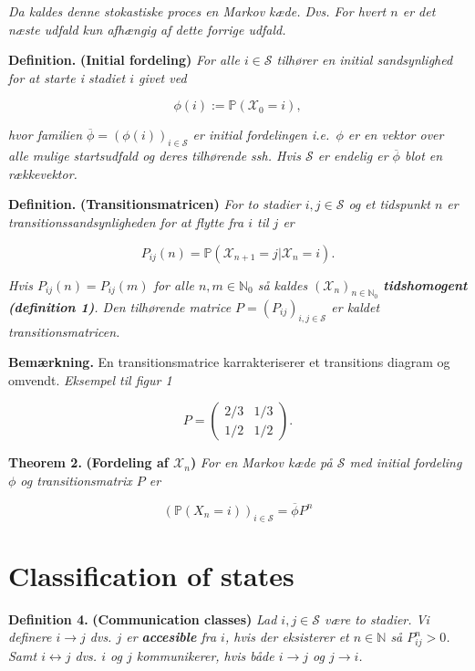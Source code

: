 \documentclass[a4paper,12pt,openany]{book}
\begin{document}
\emph{Da kaldes denne stokastiske proces en Markov kæde. Dvs. For hvert \(n\) er det næste udfald kun afhængig af dette forrige udfald.}

\textbf{Definition.} \textbf{(Initial fordeling)} \emph{For alle \(i\in\mathcal{S}\) tilhører en initial sandsynlighed for at starte i stadiet \(i\) givet ved}

\[
\phi(i):=\mathbb{P}(\mathcal{X}_0=i),
\]

\emph{hvor familien \(\overline{\phi}=(\phi(i))_{i\in\mathcal{S}}\) er initial fordelingen i.e.~\(\phi\) er en vektor over alle mulige startsudfald og deres tilhørende ssh. Hvis \(\mathcal{S}\) er endelig er \(\overline{\phi}\) blot en rækkevektor.}

\textbf{Definition.} \textbf{(Transitionsmatricen)} \emph{For to stadier \(i,j\in\mathcal{S}\) og et tidspunkt \(n\) er transitionssandsynligheden for at flytte fra \(i\) til \(j\) er}

\[
P_{ij}(n)=\mathbb{P}(\mathcal{X}_{n+1}=j \vert \mathcal{X}_n=i).
\]

\emph{Hvis \(P_{ij}(n)=P_{ij}(m)\) for alle \(n,m\in\mathbb{N}_0\) så kaldes \((\mathcal{X}_n)_{n\in\mathbb{N}_0}\) \textbf{tidshomogent (definition 1)}. Den tilhørende matrice \(P=(P_{ij})_{i,j\in\mathcal{S}}\) er kaldet transitionsmatricen.}

\textbf{Bemærkning.} En transitionsmatrice karrakteriserer et transitions diagram og omvendt. \textit{Eksempel til figur 1}

\[
P=\begin{pmatrix}
2/3 & 1/3\\
1/2 & 1/2
\end{pmatrix}.
\]

\textbf{Theorem 2.} \textbf{(Fordeling af \(\mathcal{X}_n\))} \emph{For en Markov kæde på \(\mathcal{S}\) med initial fordeling \(\phi\) og transitionsmatrix \(P\) er}

\[
(\mathbb{P}(X_n=i))_{i\in\mathcal{S}}=\overline{\phi} P^n
\]

\hypertarget{classification-of-states}{%
\section{Classification of states}\label{classification-of-states}}

\textbf{Definition 4.} \textbf{(Communication classes)} \emph{Lad \(i,j\in\mathcal{S}\) være to stadier. Vi definere \(i\longrightarrow j\) dvs. \(j\) er \textbf{accesible} fra \(i\), hvis der eksisterer et \(n\in\mathbb{N}\) så \(P_{ij}^n>0\). Samt \(i\longleftrightarrow j\) dvs. \(i\) og \(j\) kommunikerer, hvis både \(i\longrightarrow j\) og \(j\longrightarrow i\).}
\end{document}
